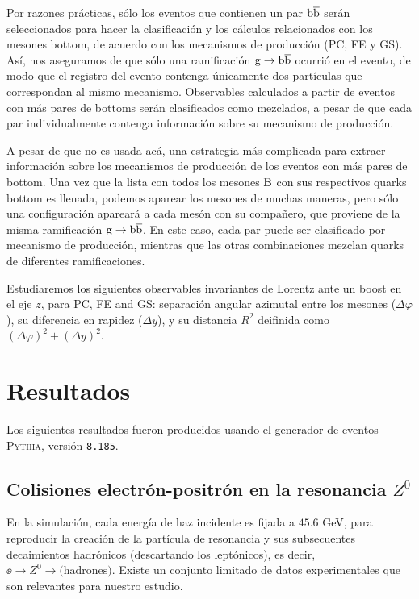 \documentclass[a4paper,12pt]{article}
\begin{document}
Por razones prácticas, sólo los eventos que contienen un par ${\mathrm b}\overline{\mathrm b}$ serán seleccionados para hacer la clasificación y los cálculos relacionados con los mesones bottom, de acuerdo con los mecanismos de producción (PC, FE y GS). Así, nos aseguramos de que sólo una ramificación ${\mathrm g}\to{\mathrm b}\overline{\mathrm b}$ ocurrió en el evento, de modo que el registro del evento contenga únicamente dos partículas que correspondan al mismo mecanismo. Observables calculados a partir de eventos con más pares de bottoms serán clasificados como mezclados, a pesar de que cada par individualmente contenga información sobre su mecanismo de producción.

A pesar de que no es usada acá, una estrategia más complicada para extraer información sobre los mecanismos de producción de los eventos con más pares de bottom. Una vez que la lista con todos los mesones ${\mathrm B}$ con sus respectivos quarks bottom es llenada, podemos aparear los mesones de muchas maneras, pero sólo una configuración apareará a cada mesón con su compañero, que proviene de la misma ramificación ${\mathrm g}\to{\mathrm b}\overline{\mathrm b}$. En este caso, cada par puede ser clasificado por mecanismo de producción, mientras que las otras combinaciones mezclan quarks de diferentes ramificaciones.

Estudiaremos los siguientes observables invariantes de Lorentz ante un boost en el eje $z$, para PC, FE and GS: separación angular azimutal entre los mesones ($\Delta\varphi$), su diferencia en rapidez ($\Delta y$), y su distancia $R^2$ deifinida como $(\Delta\varphi)^2+(\Delta y)^2$.

\section{Resultados}
\label{sec:results}

Los siguientes resultados fueron producidos usando el generador de eventos \textsc{Pythia}, versión \verb|8.185|.

\subsection{Colisiones electrón-positrón en la resonancia $Z^0$}

En la simulación, cada energía de haz incidente es fijada a $45.6$ GeV, para reproducir la creación de la partícula de resonancia y sus subsecuentes decaimientos hadrónicos (descartando los leptónicos), es decir, $\ee\to Z^0\to \mbox{(hadrones)}$. Existe un conjunto limitado de datos experimentales que son relevantes para nuestro estudio.
\end{document}
